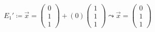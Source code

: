 \begin{gather}
E_1'\coloneqq \vec{x} = \begin{pmatrix}
0\\1\\1
\end{pmatrix}+(0) \begin{pmatrix}
1\\1\\1
\end{pmatrix} 
\leadsto \vec{x} =
\begin{pmatrix}
0\\1\\1
\end{pmatrix}
\end{gather}\\\\

